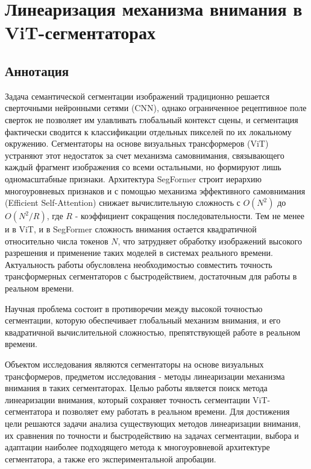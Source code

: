 \documentclass[a4paper,14pt]{article}
\numberwithin{figure}{section}
\numberwithin{table}{section}
\begin{document}
\section{Линеаризация механизма внимания в ViT-сегментаторах}

\subsection{Аннотация}

Задача семантической сегментации изображений традиционно решается сверточными нейронными сетями (CNN), 
однако ограниченное рецептивное поле сверток не позволяет им улавливать глобальный контекст сцены, 
и сегментация фактически сводится к классификации отдельных пикселей по их локальному окружению. 
Сегментаторы на основе визуальных трансформеров (ViT) устраняют этот недостаток за счет механизма самовнимания, 
связывающего каждый фрагмент изображения со всеми остальными, но формируют лишь одномасштабные признаки. 
Архитектура SegFormer строит иерархию многоуровневых признаков и с помощью механизма эффективного самовнимания (Efficient Self-Attention)
 снижает вычислительную сложность с $O(N^2)$ до $O(N^2/R)$, где $R$ - коэффициент сокращения последовательности. 
 Тем не менее и в ViT, и в SegFormer сложность внимания остается квадратичной относительно числа токенов $N$, 
 что затрудняет обработку изображений высокого разрешения и применение таких моделей в системах реального времени. 
 Актуальность работы обусловлена необходимостью совместить точность трансформерных сегментаторов с быстродействием, 
 достаточным для работы в реальном времени.

Научная проблема состоит в противоречии между высокой точностью сегментации, которую обеспечивает глобальный механизм внимания, 
и его квадратичной вычислительной сложностью, препятствующей работе в реальном времени.

Объектом исследования являются сегментаторы на основе визуальных трансформеров, предметом исследования - 
методы линеаризации механизма внимания в таких сегментаторах. Целью работы является поиск метода линеаризации внимания, 
который сохраняет точность сегментации ViT-сегментатора и позволяет ему работать в реальном времени. 
Для достижения цели решаются задачи анализа существующих методов линеаризации внимания, их сравнения по
 точности и быстродействию на задачах сегментации, выбора и адаптации наиболее подходящего метода к многоуровневой архитектуре сегментатора, 
 а также его экспериментальной апробации.
\end{document}
